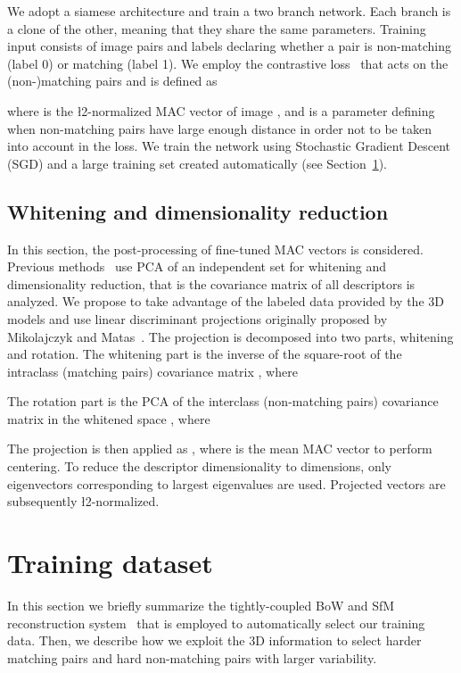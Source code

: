 \documentclass[runningheads]{llncs}
\begin{document}
We adopt a siamese architecture and train a two branch network. 
Each branch is a clone of the other, meaning that they share the same parameters. 
Training input consists of image pairs  and labels  declaring whether a pair is non-matching (label 0) or matching (label 1). 
We employ the contrastive loss~\cite{CHL05} that acts on the (non-)matching pairs and is defined as

where  is the \l2-normalized MAC vector of image , and  is a parameter defining when non-matching pairs have large enough distance in order not to be taken into account in the loss.
We train the network using Stochastic Gradient Descent (SGD) and a large training set created automatically (see Section~\ref{sec:dataset}). 
\subsection{Whitening and dimensionality reduction}
\label{ref:projections}
\vspace{-5pt}
In this section, the post-processing of fine-tuned MAC vectors is considered. 
Previous methods~\cite{BL15,TSJ16} use PCA of an independent set for whitening and dimensionality reduction, that is the covariance matrix of all descriptors is analyzed. We propose to take advantage of the labeled data provided by the 3D models and use linear discriminant projections originally proposed by Mikolajczyk and Matas~\cite{MM07}. The projection is decomposed into two parts, whitening and rotation. 
The whitening part is the inverse of the square-root of the intraclass (matching pairs) covariance matrix , where 
\vspace{-6pt}

The rotation part is the PCA of the interclass (non-matching pairs) covariance matrix in the whitened space , where 
\vspace{-6pt}

The projection  is then applied as , where  is the mean MAC vector to perform centering. To reduce the descriptor dimensionality to  dimensions, only eigenvectors corresponding to  largest eigenvalues are used.
Projected vectors are subsequently \l2-normalized. \section{Training dataset}
\label{sec:dataset}
In this section we briefly summarize the tightly-coupled BoW and SfM reconstruction system~\cite{SRCF15,RSJFCM16} that is employed to automatically select our training data. 
Then, we describe how we exploit the 3D information to select harder matching pairs and hard non-matching pairs with larger variability. 
\end{document}
